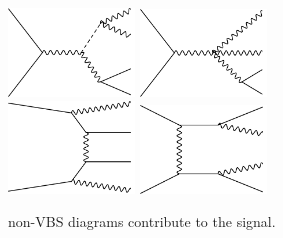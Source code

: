 \begin{figure}[H]
\begin{center}
 \includegraphics[width=0.30\textwidth,keepaspectratio]{figures/samples/feynEWKnonVBS3.pdf}
 \includegraphics[width=0.30\textwidth,keepaspectratio]{figures/samples/feynEWKnonVBS4.pdf}\\
 \includegraphics[width=0.30\textwidth,keepaspectratio]{figures/samples/feynEWKnonVBS5.pdf}
 \includegraphics[width=0.30\textwidth,keepaspectratio]{figures/samples/feynEWKnonVBS6.pdf}
 \caption[f]{
non-VBS diagrams contribute to the signal. 
}
 \label{fig:feynmanEWKnonVBS1}
\end{center}
\end{figure}
